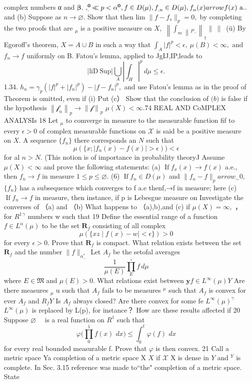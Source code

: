 complex numbers α and ${\boldsymbol{\beta}}.$ $,_{.}^{\bf0}\ll p<\alpha_{.}^{\bf0},f\in D(\mu),f_{.n}^{\bf}\in D(\mu),f_{n}^{\bf}(x) arrow f(x)\mathrm{~a.}.$ and (b) Suppose as $n\to\varnothing.$ Show that then lim $\|f-f_{s}\|_{p}=0,$ by completing the two proofs that are ${}_{\mu}$ is a positive measure on $X,$ $\left\|\int_{m}\left\|_{P_{-}}\right.\right\|_{\frac{}{\epsilon}} \|_{\frac{}{}} \|_{\frac{}{}}$ (ü) By Egoroff's theorem, $X=A\cup B$ in such a way that $\textstyle{\int}_{A}\vert f\vert^{p}<\epsilon,~\mu(B)<\infty,$ and $f_{n}\to f$ uniformly on B. Fatou's lemma, applied to JgIJ,IP,leads to $$ |\mathrm{liD~Sup} |\bigcup_{A}|\int_{H}|^{p}\,d\mu\leq\epsilon. $$ 1.34. $h_{n}=\gamma_{p}(|f|^{p}+|f_{n}|^{p})-|f-f_{n}|^{p},$ and use Fatou's lemma as in the proof of Theorem is omitted, even if (i) Put (c） Show that the conclusion of ${\mathfrak{(}}b{\mathfrak{)}}$ is false if the hypothesis $\left\|{\mathcal{f}}_{n}\right\|_{p}\to\left\|{\mathcal{f}}\right\|_{p}$ $\mu(X)<\infty.$74 REAL AND CoMPLEX ANALYSIs 18 Let ${}_{\mu}$ to comverge in measure to the measurable function fif to every $\epsilon>0$ of complex measurable functions on $\scriptstyle{\mathcal{X}}$ is said be a positive measure on $X.$ A sequence $\{f_{n}\}$ there corresponds an ${\mathbf{}}N$ such that $$ \mu(\{x;|f_{n}(x)-f(x)|>\epsilon))<\epsilon $$ for al $n>N.$ (This notion is of importance in probability theoryJ Assume $\mu(X)<\infty$ and prove the following statements: (a) $\operatorname{If}f_{x}(x)\to f(x)$ a.e., then $f_{n}\to f$ in measure $1\leq p\leq\varnothing.$ (6) $\operatorname{If}f_{n}\in D(\mu)$ and $\|f_{n}-f\|_{p} arrow_{\sim}0,$ $\{f_{n}\}$ has a subsequence which converges to f a.e thenf,→f in measure; here (c) $\operatorname{If}f_{n}\to f$ in measure, then instance, if p is Lebesgue measure on Investigate the converses of （a) and （b) What happens to （a),b),and (c) if $\mu(X)=\infty,$ ，for $R^{1\,\gamma}$ numbers w such that 19 Define the essential range of a function $f\in L^{\alpha}(\mu)$ to be the set ${\boldsymbol{R}}_{f}$ consisting of all complex $$ \mu(\{x z\mid f(x)-w\mid<\epsilon\})>0 $$ for every $\epsilon>0.$ Prove that ${\boldsymbol{R}}_{f}$ is compact. What relation exists between the set ${\boldsymbol{R}}_{f}$ and the number $\|f\|_{\alpha_{-}^{*}}$ Let $A_{f}$ be the setofal averages $$ {\frac{1}{\mu(E)}}\prod_{E}^{\circ}f\,d\mu $$ where $E\in\mathfrak{M}$ and $\mu(E)>0.$ What relations exist between $\mathbf{y}f\in L^{\infty}(\mu)Y$ Are there measures ${}_{\mu}$ u such that $A_{f}$ fails to be measures ${}^{\mu}$ such that $A_{f}$ is convex for ever $A_{f}$ and $R_{f}Y$ Is $A_{f}$ always closed? Are there convex for some fe $L^{\infty}(\mu)^{\gamma}$ $L^{\infty}(\mu)$ is replaced by L(p), for instance？ How are these results affected if 20 Suppose $\textstyle\varnothing\quad$ is a real function on $R^{1}$ such that $$ \varphi{\Biggl(}\prod_{0}^{1}f(x)\,\,d x\Biggr)\leq\int_{0}^{t}\varphi(f)\,\,d x $$ for every real bounded measurable f. Prove that $\varphi$ is then convex. 21 Call a metric space Ya completion of a metric space X $\scriptstyle{X}$ if $\scriptstyle{\mathcal{X}}$ X is dense in ${\mathbf{}}Y$ and ${}^{Y}$ is complete. In Sec. 3.15 reference was made to“the" completion of a metric space. State 